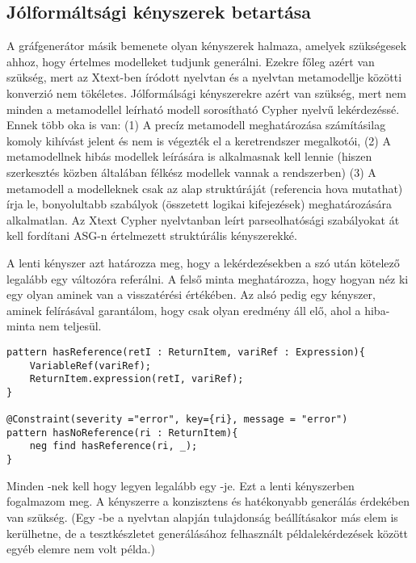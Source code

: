 \subsection{Jólformáltsági kényszerek betartása}
A gráfgenerátor másik bemenete olyan kényszerek halmaza, amelyek szükségesek ahhoz, hogy értelmes modelleket tudjunk generálni. Ezekre főleg azért van szükség, mert az Xtext-ben \cite{xText} íródott nyelvtan és a nyelvtan metamodellje közötti konverzió nem tökéletes. Jólformálsági kényszerekre azért van szükség, mert nem minden a metamodellel leírható modell sorosítható Cypher nyelvű lekérdezéssé. Ennek több oka is van: (1) A precíz metamodell meghatározása számításilag komoly kihívást jelent és nem is végezték el a keretrendszer megalkotói, (2) A metamodellnek hibás modellek leírására is alkalmasnak kell lennie (hiszen szerkesztés közben általában félkész modellek vannak a rendszerben) (3) A metamodell a modelleknek csak az alap struktúráját (referencia hova mutathat) írja le, bonyolultabb szabályok (összetett logikai kifejezések) meghatározására alkalmatlan.
 Az Xtext Cypher nyelvtanban leírt parseolhatósági szabályokat át kell fordítani ASG-n értelmezett struktúrális kényszerekké. 






A lenti kényszer azt határozza meg, hogy a lekérdezésekben a  szó után kötelező legalább egy változóra referálni. A felső minta meghatározza, hogy hogyan néz ki egy olyan  aminek van  a visszatérési értékében. Az alsó pedig egy kényszer, aminek felírásával garantálom, hogy csak olyan eredmény áll elő, ahol a hiba-minta nem teljesül.


\begin{lstlisting}[style=viatrasmall]
pattern hasReference(retI : ReturnItem, variRef : Expression){
	VariableRef(variRef);
	ReturnItem.expression(retI, variRef);
}

@Constraint(severity ="error", key={ri}, message = "error")
pattern hasNoReference(ri : ReturnItem){
	neg find hasReference(ri, _);
}
\end{lstlisting}
Minden -nek kell hogy legyen legalább egy -je. Ezt a lenti kényszerben fogalmazom meg. A kényszerre a konzisztens és hatékonyabb generálás érdekében van szükség. (Egy -be a nyelvtan alapján  tulajdonság beállításakor más elem  is kerülhetne, de a  tesztkészletet generálásához felhasznált példalekérdezések között egyéb elemre nem volt példa.) 

